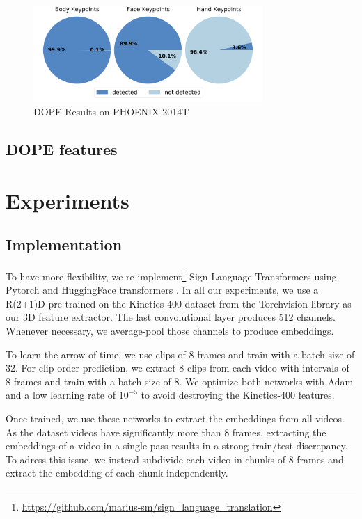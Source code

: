\documentclass[final]{cvpr}
\begin{document}
\begin{figure}[h]
		\centering
		\includegraphics[width=8.7cm]{fig/keypoints.pdf}
	\caption{DOPE Results on  PHOENIX-2014T}
	\label{fig:pie_charts}
\end{figure}


\subsection{DOPE features}

\section{Experiments}
\subsection{Implementation}

To have more flexibility, we re-implement\footnote{\url{https://github.com/marius-sm/sign_language_translation}} Sign Language Transformers \cite{neccam} using Pytorch and HuggingFace transformers \cite{huggingface}. In all our experiments, we use a R(2+1)D \cite{r2plus1} pre-trained on the Kinetics-400 \cite{kinetics} dataset from the Torchvision library as our 3D feature extractor. The last convolutional layer produces 512 channels. Whenever necessary, we average-pool those channels to produce embeddings.

To learn the arrow of time, we use clips of 8 frames and train with a batch size of 32. For clip order prediction, we extract 8 clips from each video with intervals of 8 frames and train with a batch size of 8. We optimize both networks with Adam and a low learning rate of $10^{-5}$ to avoid destroying the Kinetics-400 features.

Once trained, we use these networks to extract the embeddings from all videos. As the dataset videos have significantly more than 8 frames,  extracting the embeddings of a video in a single pass results in a strong train/test discrepancy. To adress this issue, we instead subdivide each video in chunks of 8 frames and extract the embedding of each chunk independently.
\end{document}
